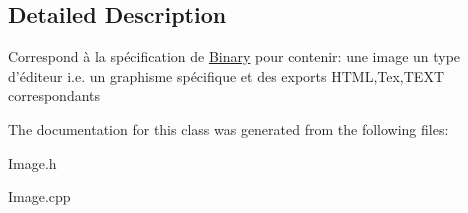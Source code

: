 \subsection{\-Detailed \-Description}
\-Correspond à la spécification de \hyperlink{classBinary}{\-Binary} pour contenir\-: une image un type d'éditeur i.\-e. un graphisme spécifique et des exports \-H\-T\-M\-L,\-Tex,\-T\-E\-X\-T correspondants 

\-The documentation for this class was generated from the following files\-:\begin{DoxyCompactItemize}
\item 
\-Image.\-h\item 
\-Image.\-cpp\end{DoxyCompactItemize}
